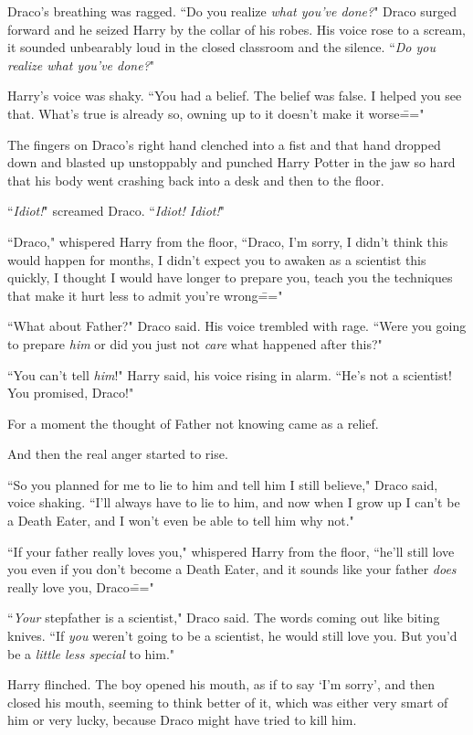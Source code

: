 Draco's breathing was ragged. ``Do you realize \emph{what you've done?}" Draco surged forward and he seized Harry by the collar of his robes. His voice rose to a scream, it sounded unbearably loud in the closed classroom and the silence. ``\emph{Do you realize what you've done?}"

Harry's voice was shaky. ``You had a belief. The belief was false. I helped you see that. What's true is already so, owning up to it doesn't make it worse\==="

The fingers on Draco's right hand clenched into a fist and that hand dropped down and blasted up unstoppably and punched Harry Potter in the jaw so hard that his body went crashing back into a desk and then to the floor.

``\emph{Idiot!}" screamed Draco. ``\emph{Idiot! Idiot!}"

``Draco," whispered Harry from the floor, ``Draco, I'm sorry, I didn't think this would happen for months, I didn't expect you to awaken as a scientist this quickly, I thought I would have longer to prepare you, teach you the techniques that make it hurt less to admit you're wrong\==="

``What about Father?" Draco said. His voice trembled with rage. ``Were you going to prepare \emph{him} or did you just not \emph{care} what happened after this?"

``You can't tell \emph{him}!" Harry said, his voice rising in alarm. ``He's not a scientist! You promised, Draco!"

For a moment the thought of Father not knowing came as a relief.

And then the real anger started to rise.

``So you planned for me to lie to him and tell him I still believe," Draco said, voice shaking. ``I'll always have to lie to him, and now when I grow up I can't be a Death Eater, and I won't even be able to tell him why not."

``If your father really loves you," whispered Harry from the floor, ``he'll still love you even if you don't become a Death Eater, and it sounds like your father \emph{does} really love you, Draco\==="

``\emph{Your} stepfather is a scientist," Draco said. The words coming out like biting knives. ``If \emph{you} weren't going to be a scientist, he would still love you. But you'd be a \emph{little less special} to him."

Harry flinched. The boy opened his mouth, as if to say `I'm sorry', and then closed his mouth, seeming to think better of it, which was either very smart of him or very lucky, because Draco might have tried to kill him.

